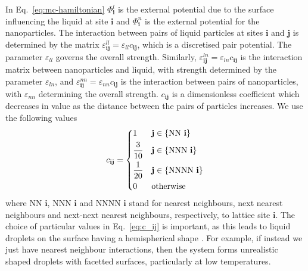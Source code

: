 \documentclass[journal=langd5,manuscript=article]{achemso}
\def\i{\mathbf{i}}
\def\j{\mathbf{j}}
\def\e{\varepsilon}
\begin{document}
{In Eq.~\eqref{eq:mc-hamiltonian}} $\Phi^l_\i$ is the external potential due
to the surface influencing the liquid at site $\i$  and $\Phi^n_\i$ is
the external potential for the nanoparticles. The interaction between
pairs of liquid particles at sites $\i$ and $\j$ is determined by the
matrix $\e^{ll}_{\i\j} = \e_{ll}c_{\i\j}$, which is a discretised pair
potential. The parameter $\e_{ll}$ governs the overall strength.
Similarly, $\e^{ln}_{\i\j} = \e_{ln}c_{\i\j}$ is the interaction matrix
between nanoparticles and liquid, with strength determined by the
parameter $\e_{ln}$, and $\e^{nn}_{\i\j} = \e_{nn}c_{\i\j}$ is the
interaction between pairs of nanoparticles, with $\e_{nn}$ determining
the overall strength. $c_{\i\j}$ is a dimensionless coefficient which
decreases in value as the distance between the pairs of particles
increases. We use the following values
%
\begin{equation}
  c_{\i\j} =
  \begin{dcases}
    1            & \j \in \{\text{NN } \i\}   \\
    \frac{3}{10} & \j \in \{\text{NNN } \i\}  \\
    \frac{1}{20} & \j \in \{\text{NNNN } \i\} \\
    0            & \text{otherwise}
  \end{dcases}
\label{eq:c_ij}
\end{equation}
%
where NN $\i$, NNN $\i$ and NNNN $\i$ stand for nearest neighbours, next
nearest neighbours and next-next nearest neighbours, respectively, to lattice site $\i$. The
choice of particular values in Eq.~\eqref{eq:c_ij} is important, as this
leads to liquid droplets on the surface having a hemispherical
shape \cite{chalmers2017}. For example, if instead we just have nearest
neighbour interactions, then the system forms unrealistic shaped
droplets with facetted surfaces, particularly at low temperatures.
\end{document}
